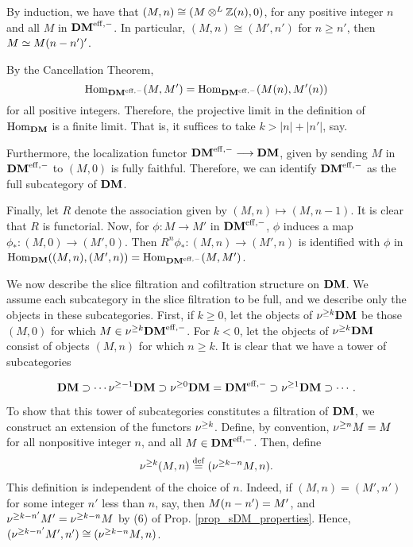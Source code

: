 \begin{rmk}
By induction, we have that $(M, n) \cong (M \tDM \Z(n), 0)$, for 
any positive integer $n$ and all $M$ in $\DMeff$. In particular,
$(M, n) \cong (M', n')$ for $n \geq n'$, then $M \simeq 
\tZ[n - n']M'$.
\end{rmk}

\begin{rmk}\label{rmk_homs_in_DM}
By the Cancellation Theorem, 
\[
\homDMf(M, M') = \homDMf(\tZ[n]{M}, \tZ[n]{M'})
\]
for all positive integers. Therefore, the projective limit in the 
definition of $\homDM$ is a finite limit. That is, it suffices to 
take $k > |n| + |n'|$, say.

Furthermore, the localization functor $\DMeff \to \DM$, given by
sending $M$ in $\DMeff$ to $(M, 0)$ is fully faithful. Therefore, we 
can identify $\DMeff$ as the full subcategory of $\DM$.

Finally, let $R$ denote the association given by $(M, n) \mapsto
(M, n - 1)$. It is clear that $R$ is functorial. Now, for $\phi: 
M \to M'$ in $\DMeff$, $\phi$ induces a map $\phi_*: (M, 0)
\to (M', 0)$. Then $R^n\phi_* : (M, n) \to (M', n)$ is identified 
with $\phi$ in $\homDM((M, n), (M', n)) = \homDMf(M, M')$.
\end{rmk}

We now describe the slice filtration and cofiltration structure on 
$\DM$. We assume each subcategory in the slice filtration to be 
full, and we describe only the objects in these subcategories. 
First, if $k \geq 0$, let the objects of $\sgDM{k} \DM$ be those 
$(M, 0)$ for which $M \in \sgDM{k} \DMeff$. For $k < 0$, let the 
objects of $\sgDM{k} \DM$ consist of objects $(M, n)$ for which 
$n \geq k$. It is clear that we have a tower of subcategories

\begin{equation}\label{eq_DM_slice_filt}
\DM \supset \cdots \sgDM{-1}\DM \supset \sgDM{0}\DM = \DMeff 
   \supset \sgDM{1}\DM \supset \cdots.
\end{equation}

To show that this tower of subcategories constitutes a filtration
of $\DM$, we construct an extension of the functors $\sgDM{k}$.
Define, by convention, $\sgDM{n} M = M$ for all nonpositive 
integer $n$, and all $M \in \DMeff$. Then, define
\[
\sgDM{k}(M, n) \defeq (\sgDM{k - n}M, n).
\]
This definition is independent of the choice of $n$. Indeed, if
$(M, n) = (M', n')$ for some integer $n'$ less than $n$, say, then
$\tZ[n - n']{M} = M'$, and $\sgDM{k - n'}M' = \sgDM{k - n}M$ by
(6) of Prop. \ref{prop_sDM_properties}. Hence, $(\sgDM{k - n'}M', 
n') \cong (\sgDM{k - n}M, n)$.

